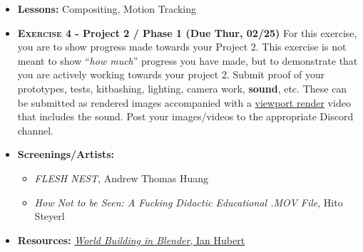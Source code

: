 \def\dMon{Mon, 02/22}
\def\dTues{Tues, 02/23}
\def\dWed{Wed, 02/24}
\def\dThur{Thur, 02/25}
\def\dFri{Fri, 02/26}
\def\dSat{Sat, 02/27}
\def\dSun{Sun, 02/28}
\placeDate





% 
\begin{itemize}[noitemsep,topsep=0pt,leftmargin=*]
    \item \textbf{Lessons:} Compositing, Motion Tracking
    \item \textbf{\textsc{Exercise 4} - Project 2 / Phase 1 (Due \dThur)} For this exercise, you are to show progress made towards your Project 2. This exercise is not meant to show ``\emph{how much}'' progress you have made, but to demonstrate that you are actively working towards your project 2. Submit proof of your prototypes, tests, kitbashing, lighting, camera work, \textbf{sound}, etc. These can be submitted as rendered images accompanied with a \href{https://docs.blender.org/manual/en/latest/editors/3dview/viewport_render.html}{viewport render} video that includes the sound. Post your images/videos to the appropriate Discord channel.
    \item \textbf{Screenings/Artists:}
          \begin{itemize}
              \item \emph{FLESH NEST}, Andrew Thomas Huang
              \item \emph{How Not to be Seen: A Fucking Didactic Educational .MOV File}, Hito Steyerl
          \end{itemize}
    \item \textbf{Resources:} \href{https://www.youtube.com/watch?v=whPWKecazgM}{\emph{World Building in Blender}, Ian Hubert}
\end{itemize}